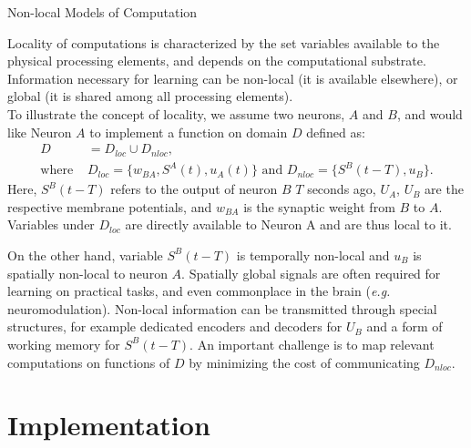 \documentclass[journal,onecolumn,11pt]{IEEEtran}
\begin{document}
\begin{infobox}
  \begin{mdframed}[backgroundcolor=black!10]\small
    \caption{\label{box:nonlocal} Non-local Models of Computation}
     Locality of computations is characterized by the set variables available to the physical processing elements, and depends on the computational substrate.
    Information necessary for learning can be non-local (it is available elsewhere), or global (it is shared among all processing elements).\\
    To illustrate the concept of locality, we assume two neurons, $A$ and $B$, and would like Neuron $A$ to implement a function on domain $D$ defined as:
    \[ 
      \begin{split}
        D & = D_{loc} \cup D_{nloc},\\
        \text{where } &D_{loc}=\{w_{BA},S^A(t), u_A(t)\}\text{ and }D_{nloc} = \{ S^B(t-T), u_{B}\}.
      \end{split}
    \]
    Here, $S^B(t-T)$ refers to the output of neuron $B$ $T$ seconds ago, $U_A$, $U_B$ are the respective membrane potentials, and $w_{BA}$ is the synaptic weight from $B$ to $A$.  
    Variables under $D_{loc}$ are directly available to Neuron A and are thus local to it. 
      
    On the other hand, variable $S^B(t-T)$ is temporally non-local and $u_{B}$ is spatially non-local to neuron $A$.
    Spatially global signals are often required for learning on practical tasks, and even commonplace in the brain (\emph{e.g.} neuromodulation).
    Non-local information can be transmitted through special structures, for example dedicated encoders and decoders for $U_B$ and a form of working memory for $S^B(t-T)$.
    An important challenge is to map relevant computations on functions of $D$ by minimizing the cost of communicating $D_{nloc}$.
    
  \end{mdframed}
\end{infobox}

\section{Implementation}
\end{document}
